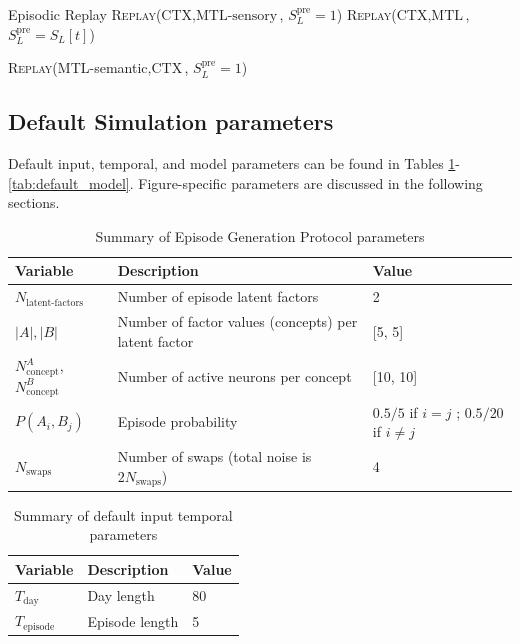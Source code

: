 \documentclass{article}
\begin{document}
\begin{algorithm}[h!]
\caption{Sleep}\label{alg:sleep}
\begin{algorithmic}[1]
\State Episodic Replay
            \State \textsc{Replay}(\textrm{CTX}$, \textrm{MTL-sensory}$, $S_L^\textrm{pre}= 1$)
        \Else
            \State \textsc{Replay}(\textrm{CTX}$, \textrm{MTL}$, $S_L^\textrm{pre}= S_L[t]$)
        \EndIf
    \EndFor

            \State \textsc{Replay}(\textrm{MTL-semantic}$, \textrm{CTX}$, $S_L^\textrm{pre}= 1$)
        \EndFor
    \EndIf
\EndFunction
\end{algorithmic}
\end{algorithm}
\subsection*{Default Simulation parameters}
Default input, temporal, and model parameters can be found in Tables \ref{tab:default_input}-\ref{tab:default_model}. Figure-specific parameters are discussed in the following sections. 
\begin{table}[ht]
\centering
\caption{Summary of Episode Generation Protocol parameters}
\label{tab:default_input}
\begin{tabular}{lll}
\toprule
\textbf{Variable} & \textbf{Description} & \textbf{Value} \\
\midrule
$N_\textrm{latent-factors}$ & Number of episode latent factors & 2 \\
$|A|, |B| $ & Number of factor values (concepts) per latent factor & [5, 5] \\
$N_\textrm{concept}^A$, $N_\textrm{concept}^B$ & Number of active neurons per concept & [10, 10] \\
$P(A_i, B_j)$ & Episode probability & $0.5/5$ if $i = j$ ; $0.5/20$ if $i\neq j$ \\
$N_\textrm{swaps}$ & Number of swaps (total noise is $2N_\textrm{swaps}$) & 4 \\
\bottomrule
\end{tabular}
\end{table}
\begin{table}[ht]
\centering
\caption{Summary of default input temporal parameters}
\label{tab:default_time}
\begin{tabular}{lll}
\toprule
\textbf{Variable} & \textbf{Description} & \textbf{Value} \\
\midrule
$T_\textrm{day}$ & Day length & 80 \\
$T_\textrm{episode}$ & Episode length & 5 \\
\bottomrule
\end{tabular}
\end{table}
\end{document}
